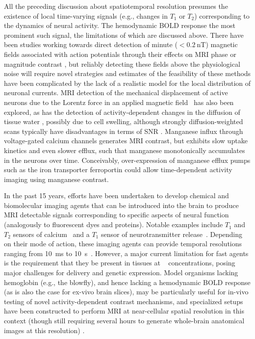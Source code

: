 All the preceding discussion about spatiotemporal resolution presumes the existence of local time-varying signals (e.g., changes in $T_1$ or $T_2$) corresponding to the dynamics of neural activity.
The hemodynamic BOLD response the most prominent such signal, the limitations of which are discussed above. There have been studies working towards direct detection of minute ($< \SI{0.2}{\nano\tesla}$) magnetic fields associated with action potentials through their effects on MRI phase or magnitude contrast \cite{Bodurka2002}, but reliably detecting these fields above the physiological noise will require novel strategies \cite{witzel2008stimulus, halpern2010magnetic} and estimates of the feasibility of these methods have been complicated by the lack of a realistic model for the local distribution of neuronal currents. MRI detection of the mechanical displacement of active neurons due to the Lorentz force in an applied magnetic field~\cite{roth2009mechanical} has also been explored, as has the detection of activity-dependent changes in the diffusion of tissue water \cite{le2006direct}, possibly due to cell swelling, although strongly diffusion-weighted scans typically have disadvantages in terms of SNR \cite{jasanoff2007bloodless}. Manganese influx through voltage-gated calcium channels \cite{lin1997manganese} generates MRI contrast, but exhibits slow uptake kinetics and even slower efflux, such that manganese  monotonically accumulates in the neurons over time. Conceivably, over-expression of manganese efflux pumps such as the iron transporter ferroportin \cite{madejczyk2012iron} could allow time-dependent activity imaging using manganese contrast.

In the past 15 years, efforts have been undertaken to develop chemical and biomolecular imaging agents that can be introduced into the brain to produce MRI detectable signals corresponding to specific aspects of neural function (analogously to fluorescent dyes and proteins).
Notable examples include $T_1$ and $T_2$ sensors of calcium~\cite{atanasijevic06,li99} and a $T_1$ sensor of neurotransmitter release~\cite{shapiro10}.
Depending on their mode of action, these imaging agents can provide temporal resolutions ranging from \SI{10}{\milli\second} to \SI{10}{\second}~\cite{shapiro06}.
However, a major current limitation for fast agents is the requirement that they be present in tissues at \si{\micro\Molar} concentrations, posing major challenges for delivery and genetic expression. Model organisms lacking hemoglobin (e.g., the blowfly), and hence lacking a hemodynamic BOLD response (as is also the case for ex-vivo brain slices), may be particularly useful for in-vivo testing of novel activity-dependent contrast mechanisms, and specialized setups have been constructed to perform MRI at near-cellular spatial resolution in this context (though still requiring several hours to generate whole-brain anatomical images at this resolution) \cite{jasanoff2002vivo}.

